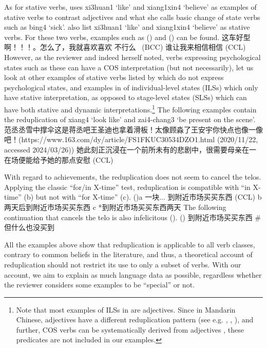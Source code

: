 \documentclass[fleqn,twoside]{article}
\begin{document}
{As for stative verbs, \citet[Sec. 3.3]{Tham2013} uses xi3huan1 `like' and xiang1xin4 `believe' as examples of stative verbs
to contrast adjectives
and what she calls basic change of state verbs such as bing4 `sick'.
\citet[680]{PeckEtAl2013} also list xi3huan1 `like' and xiang1xin4 `believe' as stative verbs.
For these two verbs, examples such as () and () can be found.
这车好型啊！！！。怎么了，我就喜欢喜欢 不行么~ (BCC)
谁让我来相信相信 (CCL)
However, as the reviewer %
and indeed \citet[669--670]{Tham2013} herself noted,
verbs expressing psychological states such as these can have a COS interpretation (but not necessarily),
let us look at other examples of stative verbs listed by \citet[680]{PeckEtAl2013} which do not express psychological states,
and examples in  \citet[Sec. 3.3.3]{XiaoMcEnery2004} of individual-level states (ILSs) which only have stative interpretation,
as opposed to stage-level states (SLSs) which can have both stative and dynamic interpretations.\footnote{
Note that most examples of ILSs in \citet[Sec. 3.3.3]{XiaoMcEnery2004} are adjectives.
Since in Mandarin Chinese, adjectives have a different reduplication pattern (see e.g. \citealt[Sec. 2.2]{Tsao2001}, \citealt[Sec. 4.1]{FanSongBond2015}, \citealt[Sec. 3]{Sui2018}),
and further, COS verbs can be systematically derived from adjectives \citep[Sec. 3]{Tham2013}, 
these predicates are not included in our examples.}
The following examples contain the reduplication of xiang4 `look like' and zai4-chang3 `be present on the scene'.
范丞丞雪中撑伞这是蒋丞吧王圣迪也拿着滑板！太像顾淼了王安宇你快点也像一像吧！(https://www.163.com/dy/article/FS1FKUC30534DZO1.html (2020/11/22, accessed 2024/03/26))
她此刻正沉浸在一个前所未有的悲剧中，很需要母亲在一在场便能给予她的那点安慰 (CCL)

With regard to achievements, the reduplication does not seem to cancel the telos.
Applying the classic ``for/in X-time'' test, reduplication is compatible with ``in X-time'' (b) but not with ``for X-time'' (c).
()a 一块... 到附近市场买买东西 (CCL)
b 两天后到附近市场买买东西
c *到附近市场买买东西两天
The following continuation that cancels the telo is also infelicitous ().
() 到附近市场买买东西 \# 但什么也没买到

All the examples above show that reduplication is applicable to all verb classes, contrary to common beliefs in the literature,
and thus, a theoretical account of reduplication should not restrict its use to only a subset of verbs.
With our account, we aim to explain as much language data as possible, regardless whether the reviewer considers some examples to be ``special'' or not.

}
\end{document}
